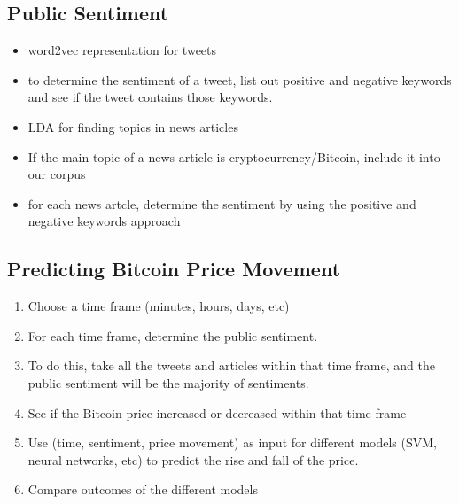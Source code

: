 \documentclass[12pt,a4paper]{report}
\begin{document}
\subsection*{Public Sentiment}
\begin{itemize}
	\item word2vec representation for tweets
	\item to determine the sentiment of a tweet, list out positive and negative keywords and see if the tweet contains those keywords.
	\item LDA for finding topics in news articles
	\item If the main topic of a news article is cryptocurrency/Bitcoin, include it into our corpus
	\item for each news artcle, determine the sentiment by using the positive and negative keywords approach
\end{itemize}

\subsection*{Predicting Bitcoin Price Movement}

\begin{enumerate}
	\item Choose a time frame (minutes, hours, days, etc)
	\item For each time frame, determine the public sentiment.
	\item To do this, take all the tweets and articles within that time frame, and the public sentiment will be the majority of sentiments.
	\item See if the Bitcoin price increased or decreased within that time frame
	\item Use (time, sentiment, price movement) as input for different models (SVM, neural networks, etc) to predict the rise and fall of the price.
	\item Compare outcomes of the different models
\end{enumerate}
\end{document}
